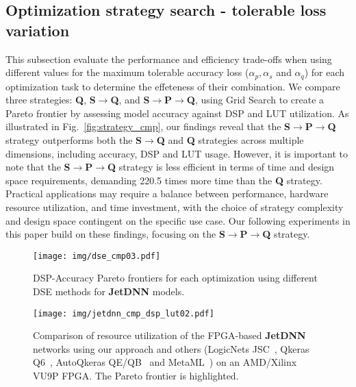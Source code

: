 \subsection{Optimization strategy search - tolerable loss variation}\label{sec:opt_search_t}
This subsection evaluate the performance and efficiency trade-offs when using different values for the maximum tolerable accuracy loss ($\alpha_p, \alpha_s$ and $\alpha_q$) for each optimization task to determine the effeteness of their combination. 
We compare three strategies: \textbf{Q}, \textbf{S$\rightarrow$Q}, and \textbf{S$\rightarrow$P$\rightarrow$Q}, using Grid Search to create a Pareto frontier by assessing model accuracy against DSP and LUT utilization.
As illustrated in Fig.~\ref{fig:strategy_cmp}, our findings reveal that the \textbf{S$\rightarrow$P$\rightarrow$Q} strategy outperforms both the \textbf{S$\rightarrow$Q} and \textbf{Q} strategies across multiple dimensions, including accuracy, DSP and LUT usage. However, it is important to note that the \textbf{S$\rightarrow$P$\rightarrow$Q} strategy is less efficient in terms of time and design space requirements, demanding 220.5 times more time than the \textbf{Q} strategy. Practical applications may require a balance between performance, hardware resource utilization, and time investment, with the choice of strategy complexity and design space contingent on the specific use case. Our following experiments in this paper build on these findings, focusing on the \textbf{S$\rightarrow$P$\rightarrow$Q} strategy.



\begin{figure}[tp]
\begin{center}
\texttt{[image: img/dse\_cmp03.pdf]}
\end{center}
   \caption{DSP-Accuracy Pareto frontiers for each optimization using different DSE methods for \textbf{JetDNN} models.}
\label{fig:dse_cmp}
\end{figure}


\begin{figure}[tp]
\begin{center}
\texttt{[image: img/jetdnn\_cmp\_dsp\_lut02.pdf]}
\end{center}
   \caption{Comparison of resource utilization of the FPGA-based \textbf{JetDNN} networks using our approach and others (LogicNets
JSC~\cite{umuroglu2020logicnets}, Qkeras Q6~\cite{coelho2021automatic}, AutoQkeras QE/QB~\cite{coelho2021automatic} and MetaML~\cite{que2023metaml}) on an AMD/Xilinx VU9P FPGA. The Pareto frontier is highlighted.  }
\label{fig:jetdnn_cmp}
\end{figure}


